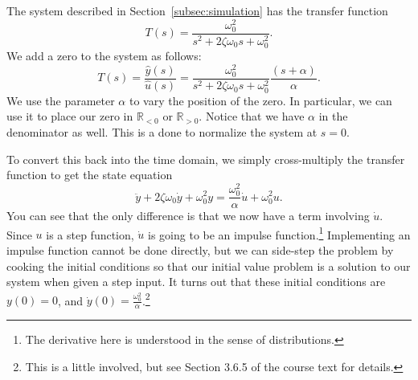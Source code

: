 The system described in Section~\ref{subsec:simulation} has the transfer
function
\begin{equation*}
T(s)=\frac{\omega_{0}^{2}}{s^{2}+2\zeta\omega_{0}s+\omega_{0}^{2}}.
\end{equation*}
We add a zero to the system as follows:
\begin{equation*}
T(s)=\frac{\hat y(s)}{\hat u(s)}=
\frac{\omega_{0}^{2}}{s^{2}+2\zeta\omega_{0}s+
\omega_{0}^{2}}\frac{(s+\alpha)}{\alpha}.
\end{equation*}
We use the parameter $\alpha$ to vary the position of the zero.  In
particular, we can use it to place our zero in $\mathbb{R}_{<0}$ or
$\mathbb{R}_{>0}$\@.  Notice that we have $\alpha$ in the denominator as
well.  This is a done to normalize the system at $s=0$\@.

To convert this back into the time domain, we simply cross-multiply the
transfer function to get the state equation
\begin{equation*}
\ddot y +2\zeta\omega_{0}\dot y+\omega_{0}^{2}y =
\frac{\omega_{0}^{2}}{\alpha}\dot u+\omega_{0}^{2}u.
\end{equation*}
You can see that the only difference is that we now have a term involving
$\dot u$.  Since $u$ is a step function, $\dot u$ is going to be an impulse
function.\footnote{The derivative here is understood in the sense of
distributions.}  Implementing an impulse function cannot be done directly,
but we can side-step the problem by cooking the initial conditions so that
our initial value problem is a solution to our system when given a step
input.  It turns out that these initial conditions are $y(0)=0$, and $\dot
y(0)=\frac{\omega_{0}^{2}}{\alpha}$\@.\footnote{This is a little involved,
but see Section 3.6.5 of the course text for
details.}
